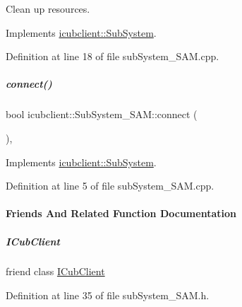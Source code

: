 Clean up resources. 



Implements \hyperlink{group__icubclient__subsystems_af327c56ad0d33aada77f825d96fb47f2}{icubclient\+::\+Sub\+System}.



Definition at line 18 of file sub\+System\+\_\+\+S\+A\+M.\+cpp.

\mbox{\label{group__icubclient__subsystems_ac92b15f98651868bc31dbf4688d50e74}} 
\subparagraph{\texorpdfstring{connect()}{connect()}}
{\footnotesize\ttfamily bool icubclient\+::\+Sub\+System\+\_\+\+S\+A\+M\+::connect (\begin{DoxyParamCaption}{ }\end{DoxyParamCaption})\hspace{0.3cm}{\ttfamily [protected]}, {\ttfamily [virtual]}}



Implements \hyperlink{group__icubclient__subsystems_a5fc84b6e51ec56f91323280b7da52dc8}{icubclient\+::\+Sub\+System}.



Definition at line 5 of file sub\+System\+\_\+\+S\+A\+M.\+cpp.



\paragraph{Friends And Related Function Documentation}
\mbox{\label{group__icubclient__subsystems_a56c42753f30380d8abf4a96bc322b3b0}} 
\subparagraph{\texorpdfstring{I\+Cub\+Client}{ICubClient}}
{\footnotesize\ttfamily friend class \hyperlink{group__icubclient__clients_classicubclient_1_1ICubClient}{I\+Cub\+Client}\hspace{0.3cm}{\ttfamily [friend]}}



Definition at line 35 of file sub\+System\+\_\+\+S\+A\+M.\+h.




